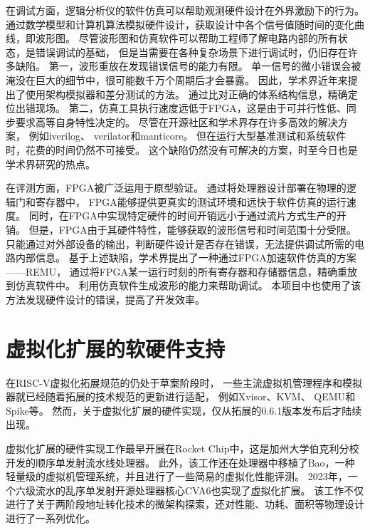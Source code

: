 在调试方面，逻辑分析仪的软件仿真可以帮助观测硬件设计在外界激励下的行为。
通过数学模型和计算机算法模拟硬件设计，获取设计中各个信号值随时间的变化曲线，即波形图。
尽管波形图和仿真软件可以帮助工程师了解电路内部的所有状态，是错误调试的基础，
但是当需要在各种复杂场景下进行调试时，仍旧存在许多缺陷。
第一，波形重放在发现错误信号的能力有限。
单一信号的微小错误会被淹没在巨大的细节中，很可能数千万个周期后才会暴露。
因此，学术界近年来提出了使用架构模拟器和差分测试的方法\cite{micro2022xiangshan}。
通过比对正确的体系结构信息，精确定位出错现场。
第二，仿真工具执行速度远低于FPGA，这是由于可并行性低、同步要求高等自身特性决定的。
尽管在开源社区和学术界存在许多高效的解决方案，
例如iverilog\cite{github:iverilog}、
verilator\cite{github:verilator}和manticore\cite{asplso23manticore}。
但在运行大型基准测试和系统软件时，花费的时间仍然不可接受。
这个缺陷仍然没有可解决的方案，时至今日也是学术界研究的热点。

在评测方面，FPGA被广泛运用于原型验证。
通过将处理器设计部署在物理的逻辑门和寄存器中，
FPGA能够提供更真实的测试环境和远快于软件仿真的运行速度。
同时，在FPGA中实现特定硬件的时间开销远小于通过流片方式生产的开销。
但是，FPGA由于其硬件特性，能够获取的波形信号和时间范围十分受限。
只能通过对外部设备的输出，判断硬件设计是否存在错误，无法提供调试所需的电路内部信息。
基于上述缺陷，学术界提出了一种通过FPGA加速软件仿真的方案——REMU\cite{iccd2023remu}，
通过将FPGA某一运行时刻的所有寄存器和存储器信息，精确重放到仿真软件中。
利用仿真软件生成波形的能力来帮助调试。
本项目中也使用了该方法发现硬件设计的错误，提高了开发效率。

\section{虚拟化扩展的软硬件支持}
在RISC-V虚拟化拓展规范的仍处于草案阶段时，
一些主流虚拟机管理程序和模拟器就已经随着拓展的技术规范的更新进行适配，
例如Xvisor\cite{micro2022xiangshan}、KVM\cite{kvm:H-ext}、
QEMU\cite{qemu-riscv:H-ext}和Spike\cite{github:spike}等。
然而，关于虚拟化扩展的硬件实现，仅从拓展的0.6.1版本发布后才陆续出现。

虚拟化扩展的硬件实现工作最早开展在Rocket Chip\cite{itco2022rocket}中，这是加州大学伯克利分校开发的顺序单发射流水线处理器。
此外，该工作还在处理器中移植了Bao，一种轻量级的虚拟机管理系统\cite{ng-res2020bao}，并且进行了一些简易的虚拟化性能评测。
2023年，一个六级流水的乱序单发射开源处理器核心CVA6\cite{tvlsi2023cva6}也实现了虚拟化扩展。
该工作不仅进行了关于两阶段地址转化技术的微架构探索，还对性能、功耗、面积等物理设计进行了一系列优化。

